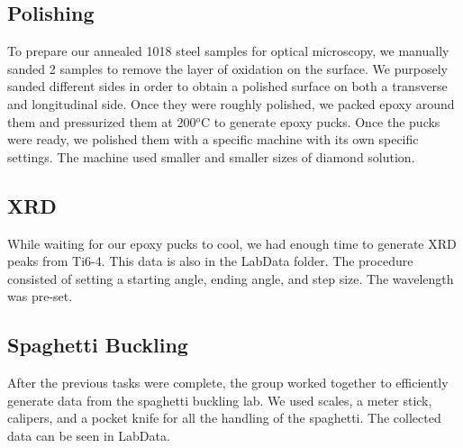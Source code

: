 \documentclass{article}
\begin{document}
\subsection{Polishing}
To prepare our annealed 1018 steel samples for optical microscopy, we manually sanded 2 samples to remove the layer of oxidation on the surface. We purposely sanded different sides in order to obtain a polished surface on both a transverse and longitudinal side. Once they were roughly polished, we packed epoxy around them and pressurized them at 200$^o$C to generate epoxy pucks. Once the pucks were ready, we polished them with a specific machine with its own specific settings. The machine used smaller and smaller sizes of diamond solution.

\subsection{XRD}
While waiting for our epoxy pucks to cool, we had enough time to generate XRD peaks from Ti6-4. This data is also in the LabData folder. The procedure consisted of setting a starting angle, ending angle, and step size. The wavelength was pre-set.

\subsection{Spaghetti Buckling}
After the previous tasks were complete, the group worked together to efficiently generate data from the spaghetti buckling lab. We used scales, a meter stick, calipers, and a pocket knife for all the handling of the spaghetti. The collected data can be seen in LabData.
\end{document}
